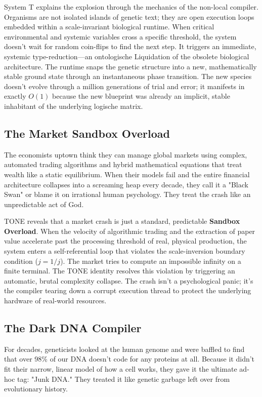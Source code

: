 \documentclass[11pt,a4paper]{article}
\begin{document}
System T explains the explosion through the mechanics of the non-local compiler. Organisms are not isolated islands of genetic text; they are open execution loops embedded within a scale-invariant biological runtime. When critical environmental and systemic variables cross a specific threshold, the system doesn't wait for random coin-flips to find the next step. It triggers an immediate, systemic type-reduction—an ontologische Liquidation of the obsolete biological architecture. The runtime snaps the genetic structure into a new, mathematically stable ground state through an instantaneous phase transition. The new species doesn't evolve through a million generations of trial and error; it manifests in exactly $O(1)$ because the new blueprint was already an implicit, stable inhabitant of the underlying logische matrix.


\subsection{The Market Sandbox Overload}
The economists uptown think they can manage global markets using complex, automated trading algorithms and hybrid mathematical equations that treat wealth like a static equilibrium. When their models fail and the entire financial architecture collapses into a screaming heap every decade, they call it a "Black Swan" or blame it on irrational human psychology. They treat the crash like an unpredictable act of God.

TONE reveals that a market crash is just a standard, predictable \textbf{Sandbox Overload}. When the velocity of algorithmic trading and the extraction of paper value accelerate past the processing threshold of real, physical production, the system enters a self-referential loop that violates the scale-inversion boundary condition ($j = 1/j$). The market tries to compute an impossible infinity on a finite terminal. The TONE identity resolves this violation by triggering an automatic, brutal complexity collapse. The crash isn't a psychological panic; it's the compiler tearing down a corrupt execution thread to protect the underlying hardware of real-world resources.

\subsection{The Dark DNA Compiler}
For decades, geneticists looked at the human genome and were baffled to find that over 98\% of our DNA doesn't code for any proteins at all. Because it didn't fit their narrow, linear model of how a cell works, they gave it the ultimate ad-hoc tag: "Junk DNA." They treated it like genetic garbage left over from evolutionary history.
\end{document}
